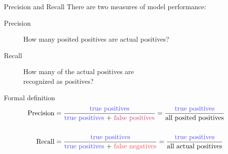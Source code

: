 \documentclass[professionalfonts, xcolor={usenames,svgnames,x11names,table}]{beamer}
\begin{document}
\begin{frame}{Precision and Recall}
    There are two measures of model performance:

    \begin{description}
        \item[Precision] How many posited positives are actual positives?
        \item[Recall]    How many of the actual positives are\\
                         recognized as positives?
    \end{description}
    
    \begin{block}{Formal definition}
        \begin{align*}
            \text{Precision}
                &= \frac{%
                         \text{\color{blue!75}true positives}}{%
                         \text{\textcolor{blue!75}{true positives} +
                               \textcolor{purple!75}{false positives}}
                         }
                = \frac{\text{\color{blue!75}true positives}}{\text{all posited positives}}\\
                \\
            \text{Recall}
                &= \frac{%
                         \text{\color{blue!75}true positives}}{%
                         \text{\textcolor{blue!75}{true positives} +
                               \textcolor{red!75}{false negatives}}
                         }
                = \frac{\text{\color{blue!75}true positives}}{\text{all actual positives}}\\
        \end{align*}
    \end{block}
\end{frame}
\end{document}

